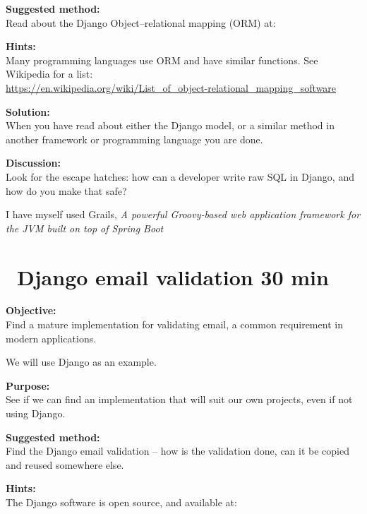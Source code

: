 \documentclass[a4paper,11pt,notitlepage]{report}
\begin{document}
{\bf Suggested method:}\\
Read about the Django  Object–relational mapping (ORM) at:

\begin{list2}
\item {}
\item {}
\end{list2}

{\bf Hints:}\\
Many programming languages use ORM and have similar functions. See Wikipedia for a list:\\
\url{https://en.wikipedia.org/wiki/List_of_object-relational_mapping_software}

{\bf Solution:}\\
When you have read about either the Django model, or a similar method in another framework or programming language you are done.

{\bf Discussion:}\\
Look for the escape hatches: how can a developer write raw SQL in Django, and how do you make that safe?

I have myself used Grails,
\emph{A powerful Groovy-based web application framework for the JVM built on top of Spring Boot}



\chapter{\faInfoCircle\ Django email validation 30 min}
\label{ex:django-email}

{\bf Objective:}\\
Find a mature implementation for validating email, a common requirement in modern applications.

We will use Django as an example.

{\bf Purpose:}\\
See if we can find an implementation that will suit our own projects, even if not using Django.

{\bf Suggested method:}\\
Find the Django email validation -- how is the validation done, can it be copied and reused somewhere else.

{\bf Hints:}\\
The Django software is open source, and available at:\\
\end{document}
